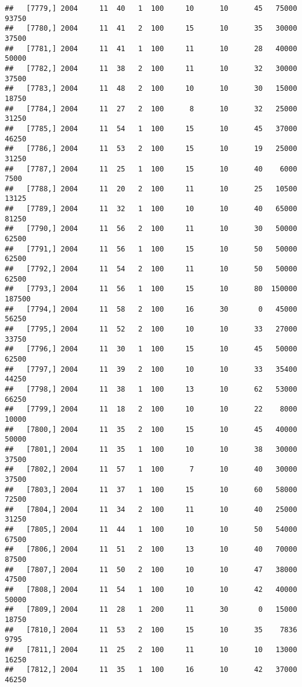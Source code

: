 \documentclass{article}\usepackage[]{graphicx}\usepackage[]{color}
\makeatletter
\newenvironment{kframe}{%
 \def\at@end@of@kframe{}%
 \ifinner\ifhmode%
  \def\at@end@of@kframe{\end{minipage}}%
  \begin{minipage}{\columnwidth}%
 \fi\fi%
 \def\FrameCommand##1{\hskip\@totalleftmargin \hskip-\fboxsep
 \colorbox{shadecolor}{##1}\hskip-\fboxsep
     \hskip-\linewidth \hskip-\@totalleftmargin \hskip\columnwidth}%
 \MakeFramed {\advance\hsize-\width
   \@totalleftmargin\z@ \linewidth\hsize
   \@setminipage}}%
 {\par\unskip\endMakeFramed%
 \at@end@of@kframe}
\newenvironment{knitrout}{}{} %
\makeatother
\begin{document}
\begin{knitrout}
\begin{kframe}
\begin{verbatim}
##   [7779,] 2004     11  40   1  100     10      10      45   75000   93750
##   [7780,] 2004     11  41   2  100     15      10      35   30000   37500
##   [7781,] 2004     11  41   1  100     11      10      28   40000   50000
##   [7782,] 2004     11  38   2  100     11      10      32   30000   37500
##   [7783,] 2004     11  48   2  100     10      10      30   15000   18750
##   [7784,] 2004     11  27   2  100      8      10      32   25000   31250
##   [7785,] 2004     11  54   1  100     15      10      45   37000   46250
##   [7786,] 2004     11  53   2  100     15      10      19   25000   31250
##   [7787,] 2004     11  25   1  100     15      10      40    6000    7500
##   [7788,] 2004     11  20   2  100     11      10      25   10500   13125
##   [7789,] 2004     11  32   1  100     10      10      40   65000   81250
##   [7790,] 2004     11  56   2  100     11      10      30   50000   62500
##   [7791,] 2004     11  56   1  100     15      10      50   50000   62500
##   [7792,] 2004     11  54   2  100     11      10      50   50000   62500
##   [7793,] 2004     11  56   1  100     15      10      80  150000  187500
##   [7794,] 2004     11  58   2  100     16      30       0   45000   56250
##   [7795,] 2004     11  52   2  100     10      10      33   27000   33750
##   [7796,] 2004     11  30   1  100     15      10      45   50000   62500
##   [7797,] 2004     11  39   2  100     10      10      33   35400   44250
##   [7798,] 2004     11  38   1  100     13      10      62   53000   66250
##   [7799,] 2004     11  18   2  100     10      10      22    8000   10000
##   [7800,] 2004     11  35   2  100     15      10      45   40000   50000
##   [7801,] 2004     11  35   1  100     10      10      38   30000   37500
##   [7802,] 2004     11  57   1  100      7      10      40   30000   37500
##   [7803,] 2004     11  37   1  100     15      10      60   58000   72500
##   [7804,] 2004     11  34   2  100     11      10      40   25000   31250
##   [7805,] 2004     11  44   1  100     10      10      50   54000   67500
##   [7806,] 2004     11  51   2  100     13      10      40   70000   87500
##   [7807,] 2004     11  50   2  100     10      10      47   38000   47500
##   [7808,] 2004     11  54   1  100     10      10      42   40000   50000
##   [7809,] 2004     11  28   1  200     11      30       0   15000   18750
##   [7810,] 2004     11  53   2  100     15      10      35    7836    9795
##   [7811,] 2004     11  25   2  100     11      10      10   13000   16250
##   [7812,] 2004     11  35   1  100     16      10      42   37000   46250

\end{verbatim}
\end{kframe}
\end{knitrout}
\end{document}

